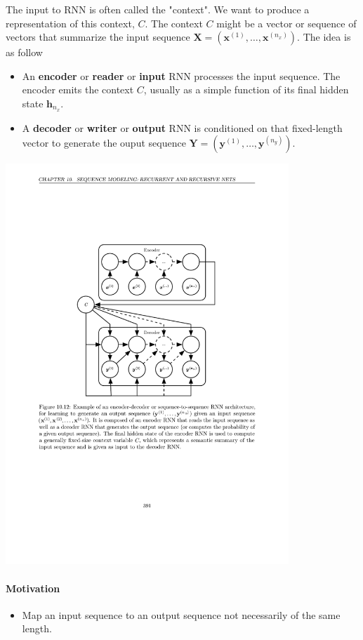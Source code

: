 \documentclass[12pt, a4paper]{article}
\def\vh{\boldsymbol{h}}
\def\vX{\boldsymbol{X}}
\def\vY{\boldsymbol{Y}}
\newcommand{\egvx}[1]{\boldsymbol{x}^{(#1)}}
\newcommand{\egvy}[1]{\boldsymbol{y}^{(#1)}}
\begin{document}
The input to RNN is often called the "context". We want to produce a representation of this context, $C$. The context $C$ might be a vector or sequence of vectors that summarize the input sequence $\vX = (\egvx{1},\dots,\egvx{n_x})$.
The idea is as follow
\begin{itemize}
    \item An \textbf{encoder} or \textbf{reader} or \textbf{input} RNN processes the input sequence. The encoder emits the context $C$, usually as a simple function of its final hidden state $\vh_{n_x}$.
    \item A \textbf{decoder} or \textbf{writer} or \textbf{output} RNN is conditioned on that fixed-length vector to generate the ouput sequence $\vY = (\egvy{1},\dots,\egvy{n_y})$.
\end{itemize}
\begin{center}
    \includegraphics[width=0.8\textwidth]{../imgs/Seq2Seq.pdf}
\end{center}

\paragraph{Motivation}
\begin{itemize}
    \item Map an input sequence to an output sequence not necessarily of the same length.
\end{itemize}
\end{document}
